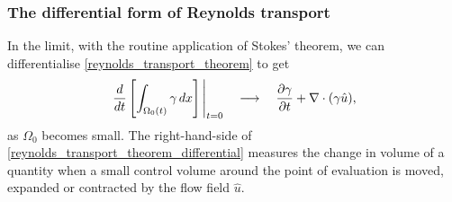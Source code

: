 \subsubsection{The differential form of Reynolds transport}
 In the limit, with the routine application of Stokes' theorem, we can differentialise \eqref{reynolds_transport_theorem}
to get
\begin{equation}\label{reynolds_transport_theorem_differential}
    \eval{\frac{d}{dt}\left[\int_{\Omega_0(t)}\gamma\,dx\right]}_{t=0} \quad\longrightarrow\quad \Part{\gamma}{t} + \nabla \cdot(\gamma \hat{u}),
\end{equation}
as $\Omega_0$ becomes small.
The right-hand-side of \eqref{reynolds_transport_theorem_differential} measures
the change in volume of a quantity when a small control volume around the point of evaluation is moved, expanded or contracted by the flow field $\hat{u}$.

